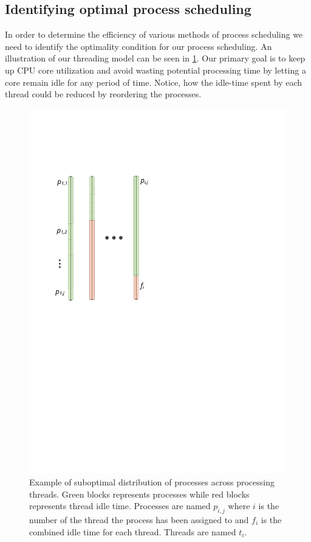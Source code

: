 \subsection{Identifying optimal process scheduling}
In order to determine the efficiency of various methods of process
scheduling we need to identify the optimality condition for our
process scheduling. An illustration of our threading model can be seen
in \cref{fig:suboptdist}. Our primary goal is to keep up CPU core
utilization and avoid wasting potential processing time by letting a
core remain idle for any period of time. Notice, how the idle-time
spent by each thread could be reduced by reordering the processes.
\begin{figure}
\centering
\includegraphics{figures/parallel}
\caption[Proposed SME parallelization model]{Example of suboptimal
  distribution of processes across processing threads. Green blocks
  represents processes while red blocks represents thread idle
  time. Processes are named $p_{i,j}$ where $i$ is the number of the
  thread the process has been assigned to and $f_i$ is the combined
  idle time for each thread. Threads are named $t_i$.}

\label{fig:suboptdist}

\end{figure}



